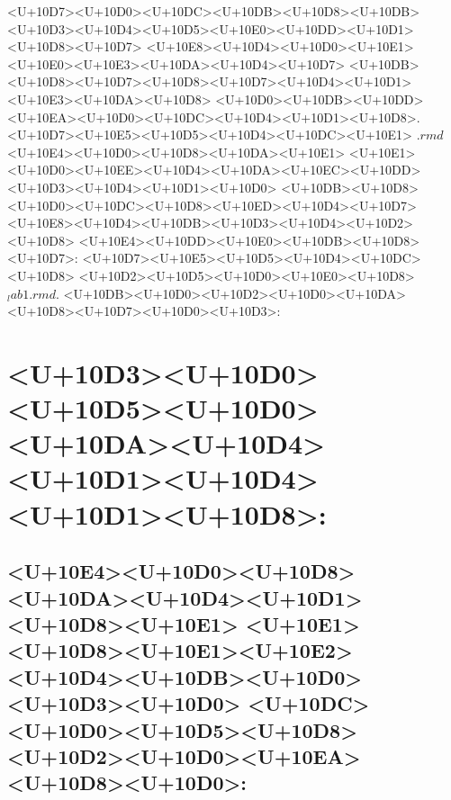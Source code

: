 \documentclass{article}
\begin{document}
<U+10D7><U+10D0><U+10DC><U+10DB><U+10D8><U+10DB><U+10D3><U+10D4><U+10D5><U+10E0><U+10DD><U+10D1><U+10D8><U+10D7> <U+10E8><U+10D4><U+10D0><U+10E1><U+10E0><U+10E3><U+10DA><U+10D4><U+10D7> <U+10DB><U+10D8><U+10D7><U+10D8><U+10D7><U+10D4><U+10D1><U+10E3><U+10DA><U+10D8> <U+10D0><U+10DB><U+10DD><U+10EA><U+10D0><U+10DC><U+10D4><U+10D1><U+10D8>. <U+10D7><U+10E5><U+10D5><U+10D4><U+10DC><U+10E1> $.rmd$ <U+10E4><U+10D0><U+10D8><U+10DA><U+10E1> <U+10E1><U+10D0><U+10EE><U+10D4><U+10DA><U+10EC><U+10DD><U+10D3><U+10D4><U+10D1><U+10D0> <U+10DB><U+10D8><U+10D0><U+10DC><U+10D8><U+10ED><U+10D4><U+10D7> <U+10E8><U+10D4><U+10DB><U+10D3><U+10D4><U+10D2><U+10D8> <U+10E4><U+10DD><U+10E0><U+10DB><U+10D8><U+10D7>: <U+10D7><U+10E5><U+10D5><U+10D4><U+10DC><U+10D8> <U+10D2><U+10D5><U+10D0><U+10E0><U+10D8>$_lab1.rmd$. <U+10DB><U+10D0><U+10D2><U+10D0><U+10DA><U+10D8><U+10D7><U+10D0><U+10D3>:


\section*{<U+10D3><U+10D0><U+10D5><U+10D0><U+10DA><U+10D4><U+10D1><U+10D4><U+10D1><U+10D8>:}

\subsection*{<U+10E4><U+10D0><U+10D8><U+10DA><U+10D4><U+10D1><U+10D8><U+10E1> <U+10E1><U+10D8><U+10E1><U+10E2><U+10D4><U+10DB><U+10D0> <U+10D3><U+10D0> <U+10DC><U+10D0><U+10D5><U+10D8><U+10D2><U+10D0><U+10EA><U+10D8><U+10D0>:}
\end{document}
